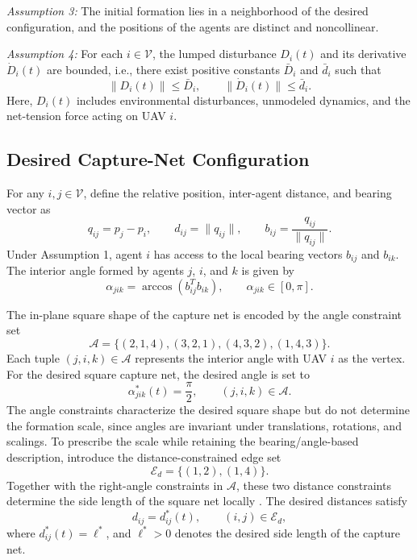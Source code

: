 \documentclass[lettersize,journal]{IEEEtran}
\begin{document}
\emph{Assumption 3:} The initial formation lies in a neighborhood of the desired configuration, and the positions of the agents are distinct and noncollinear.

\emph{Assumption 4:} For each \(i\in\mathcal V\), the lumped disturbance \(D_i(t)\) and its derivative \(\dot D_i(t)\) are bounded, i.e., there exist positive constants \(\bar D_i\) and \(\bar d_i\) such that
\begin{equation}
\label{eq:disturbance-bound}
\|D_i(t)\|\le \bar D_i,\qquad
\|\dot D_i(t)\|\le \bar d_i.
\end{equation}
Here, \(D_i(t)\) includes environmental disturbances, unmodeled dynamics, and the net-tension force acting on UAV \(i\).

\subsection{Desired Capture-Net Configuration}

For any \(i,j\in\mathcal V\), define the relative position, inter-agent distance, and bearing vector as
\begin{equation}
\label{eq:bearing-definition}
q_{ij}=p_j-p_i,\qquad
d_{ij}=\|q_{ij}\|,\qquad
b_{ij}=\frac{q_{ij}}{\|q_{ij}\|}.
\end{equation}
Under Assumption 1, agent \(i\) has access to the local bearing vectors \(b_{ij}\) and \(b_{ik}\). The interior angle formed by agents \(j\), \(i\), and \(k\) is given by
\begin{equation}
\label{eq:angle-definition}
\alpha_{jik}=\arccos\left(b_{ij}^{T}b_{ik}\right),
\qquad \alpha_{jik}\in[0,\pi].
\end{equation}

The in-plane square shape of the capture net is encoded by the angle constraint set
\begin{equation}
\label{eq:angle-set}
\mathcal A=\{(2,1,4),(3,2,1),(4,3,2),(1,4,3)\}.
\end{equation}
Each tuple \((j,i,k)\in\mathcal A\) represents the interior angle with UAV \(i\) as the vertex. For the desired square capture net, the desired angle is set to
\begin{equation}
\label{eq:desired-angle}
\alpha_{jik}^*(t)=\frac{\pi}{2},
\qquad (j,i,k)\in\mathcal A.
\end{equation}
The angle constraints characterize the desired square shape but do not determine the formation scale, since angles are invariant under translations, rotations, and scalings. To prescribe the scale while retaining the bearing/angle-based description, introduce the distance-constrained edge set
\begin{equation}
\label{eq:distance-edge-set}
\mathcal E_d=\{(1,2),(1,4)\}.
\end{equation}
Together with the right-angle constraints in \(\mathcal A\), these two distance constraints determine the side length of the square net locally \cite{li2025localInfo}. The desired distances satisfy
\begin{equation}
\label{eq:desired-distance}
d_{ij}=d_{ij}^*(t),
\qquad
(i,j)\in\mathcal E_d,
\end{equation}
where \(d_{ij}^*(t)=\ell^*\), and \(\ell^*>0\) denotes the desired side length of the capture net.
\end{document}

